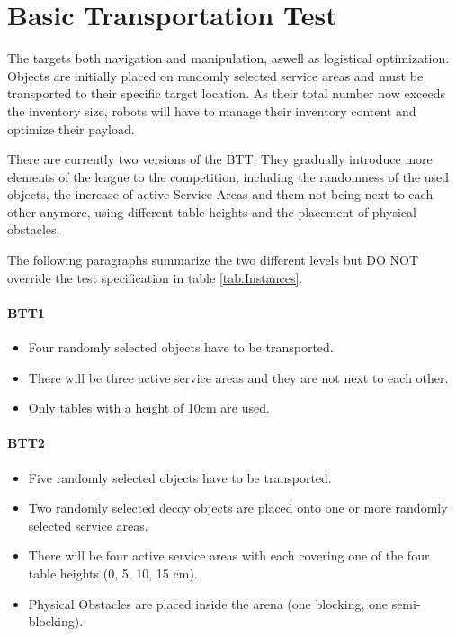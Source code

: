 
\section{Basic Transportation Test}
\label{sec:Basic Transportation Test}

The  targets both navigation and manipulation, aswell as logistical optimization. Objects are initially placed on randomly selected service areas and must be transported to their specific target location.
As their total number now exceeds the inventory size, robots will have to manage their inventory content and optimize their payload.

There are currently two versions of the BTT. 
They gradually introduce more elements of the league to the competition, including the randomness of the used objects, the increase of active Service Areas and them not being next to each other anymore, using different table heights and the placement of physical obstacles.

The following paragraphs summarize the two different levels but DO NOT override the test specification in table \ref{tab:Instances}.

\paragraph{BTT1}
\begin{itemize}
\item Four randomly selected objects have to be transported.
\item There will be three active service areas and they are not next to each other.
\item Only tables with a height of 10cm are used. 
\end{itemize}

\paragraph{BTT2}
\begin{itemize}
\item Five randomly selected objects have to be transported.
\item Two randomly selected decoy objects are placed onto one or more randomly selected service areas.
\item There will be four active service areas with each covering one of the four table heights (0, 5, 10, 15 $\si{\centi\meter}$).
\item Physical Obstacles are placed inside the arena (one blocking, one semi-blocking).
\end{itemize}